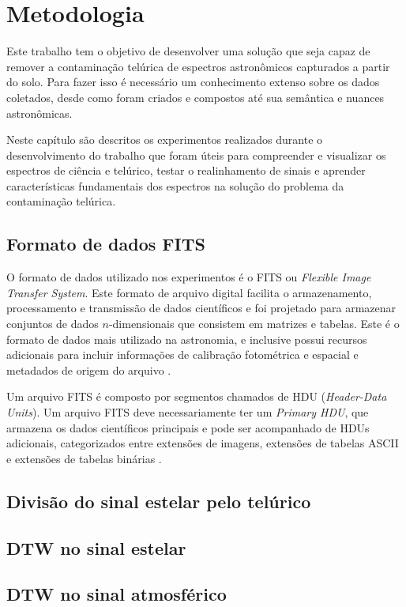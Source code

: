 \chapter{Metodologia}
\label{cap:desenvolvimentos}

Este trabalho tem o objetivo de desenvolver uma solução que seja capaz de remover a contaminação telúrica de espectros astronômicos capturados a partir do solo. Para fazer isso é necessário um conhecimento extenso sobre os dados coletados, desde como foram criados e compostos até sua semântica e nuances astronômicas.  

Neste capítulo são descritos os experimentos realizados durante o desenvolvimento do trabalho que foram úteis para compreender e visualizar os espectros de ciência e telúrico, testar o realinhamento de sinais e aprender características fundamentais dos espectros na solução do problema da contaminação telúrica.  

\section{Formato de dados FITS}

O formato de dados utilizado nos experimentos é o FITS ou \textit{Flexible Image Transfer System}. Este formato de arquivo digital facilita o armazenamento, processamento e transmissão de dados científicos e foi projetado para armazenar conjuntos de dados $n$-dimensionais que consistem em matrizes e tabelas. Este é o formato de dados mais utilizado na astronomia, e inclusive possui recursos adicionais para incluir informações de calibração fotométrica e espacial e metadados de origem do arquivo \citep{pence2010definition}.

Um arquivo FITS é composto por segmentos chamados de HDU (\textit{Header-Data Units}). Um arquivo FITS deve necessariamente ter um \textit{Primary HDU}, que armazena os dados científicos principais e pode ser acompanhado de HDUs adicionais, categorizados entre extensões de imagens, extensões de tabelas ASCII e extensões de tabelas binárias \citep{nasa-fits}.

\section{Divisão do sinal estelar pelo telúrico}

\section{DTW no sinal estelar}

\section{DTW no sinal atmosférico}
